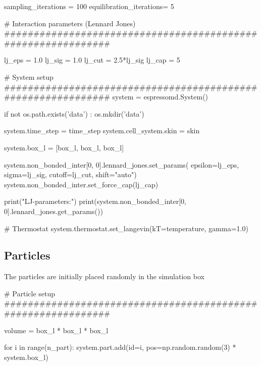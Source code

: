 \documentclass[
paper=a4,                       %
fontsize=11pt,                  %
twoside,                        %
footsepline,                    %
headsepline,                    %
headinclude=false,              %
footinclude=false,              %
pagesize,                       %
]{scrartcl}
\newtheorem{task}{Task}
\begin{document}
{{\begin{pypresso}
sampling_iterations     = 100
equilibration_iterations= 5 


# Interaction parameters (Lennard Jones)
#############################################################

lj_eps = 1.0
lj_sig = 1.0
lj_cut = 2.5*lj_sig
lj_cap = 5 


# System setup
#############################################################
system              = espressomd.System()

if not os.path.exists('data') :
    os.mkdir('data')

system.time_step    = time_step
system.cell_system.skin         = skin

system.box_l = [box_l, box_l, box_l]

system.non_bonded_inter[0, 0].lennard_jones.set_params(
    epsilon=lj_eps, sigma=lj_sig,
    cutoff=lj_cut, shift="auto")
system.non_bonded_inter.set_force_cap(lj_cap)

print("LJ-parameters:")
print(system.non_bonded_inter[0, 0].lennard_jones.get_params())

# Thermostat
system.thermostat.set_langevin(kT=temperature, gamma=1.0)
\end{pypresso}


\subsection{Particles}
The particles are initially placed randomly in the simulation box

\begin{pypresso}
# Particle setup
#############################################################

volume = box_l * box_l * box_l

for i in range(n_part):
    system.part.add(id=i, pos=np.random.random(3) * system.box_l)
\end{pypresso}}\vspace{0,2cm}

   \vspace{1cm}}
\end{document}
